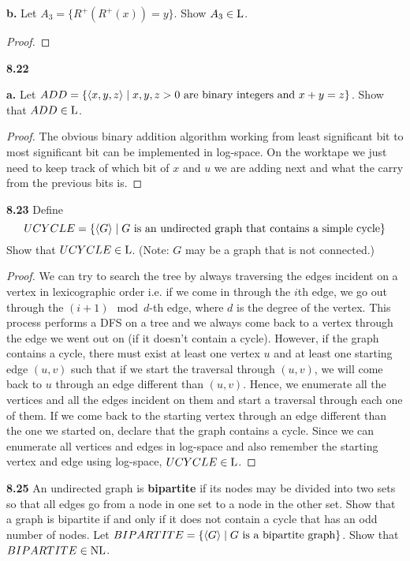\textbf{b.} Let $A_3 = \{ R^+(R^+(x)) = y\}$. Show $A_3 \in \text{L}$.
\begin{mdframed}
\begin{proof}
\end{proof}
\end{mdframed}



\label{lang:ADD_L}
\textbf{8.22} 

\textbf{a.} Let $ADD = \{ \langle{x, y, z}\rangle \mid x, y, z >0 \text{ are binary integers and } x+ y = z\}$. Show that $ADD \in \text{L}$.
\begin{mdframed}
\begin{proof}
The obvious binary addition algorithm working from least significant bit to most significant bit can be implemented in log-space. On the worktape we just need to keep track of which bit of $x$ and $u$ we are adding next and what the carry from the previous bits is.
\end{proof}
\end{mdframed}

\label{lang:UCYCLE_L}
\textbf{8.23} Define 
\[
UCYCLE = \{\langle{G}\rangle \mid G \text{ is an undirected graph that contains a simple cycle} \}
\]
Show that $UCYCLE \in \text{L}$. (Note: $G$ may be a graph that is not connected.)
\begin{mdframed}
\begin{proof}
We can try to search the tree by always traversing the edges incident on a vertex in lexicographic order i.e. if we come in through the $i$th edge, we go out through the $(i+1)\mod d$-th edge, where $d$ is the degree of the vertex. This process performs a DFS on a tree and we always come back to a vertex through the edge we went out on (if it doesn't contain a cycle). However, if the graph contains a cycle, there must exist at least one vertex $u$ and at least one starting edge $(u, v)$ such that if we start the traversal through $(u, v)$, we will come back to $u$ through an edge different than $(u, v)$. Hence, we enumerate all the vertices and all the edges incident on them and start a traversal through each one of them. If we come back to the starting vertex through an edge different than the one we started on, declare that the graph contains a cycle. Since we can enumerate all vertices and edges in log-space and also remember the starting vertex and edge using log-space, $UCYCLE \in \text{L}$.
\end{proof}
\end{mdframed}

\label{lang:BIPARTITE_NL}
\textbf{8.25} An undirected graph is \textbf{bipartite} if its nodes may be divided into two sets so that all edges go from a node in one set to a node in the other set. Show that a graph is bipartite if and only if it does not contain a cycle that has an odd number of nodes. Let $BIPARTITE = \{ \langle{G}\rangle \mid G  \text{ is a bipartite graph} \}$. Show that $BIPARTITE \in \text{NL}$.

